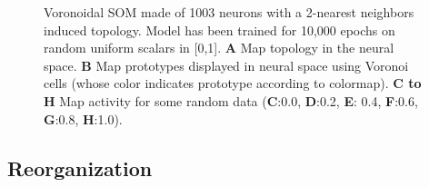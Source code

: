 \begin{figure}
  \caption{Voronoidal SOM made of 1003 neurons with a 2-nearest neighbors
    induced topology. Model has been trained for 10,000 epochs on random
    uniform scalars in [0,1]. \textbf{A} Map topology in the neural
    space. \textbf{B} Map prototypes displayed in neural space using Voronoi
    cells (whose color indicates prototype according to colormap). \textbf{C to
      H} Map activity for some random data (\textbf{C}:0.0, \textbf{D}:0.2,
    \textbf{E}: 0.4, \textbf{F}:0.6, \textbf{G}:0.8, \textbf{H}:1.0).}
\end{figure}


\subsection{Reorganization}
